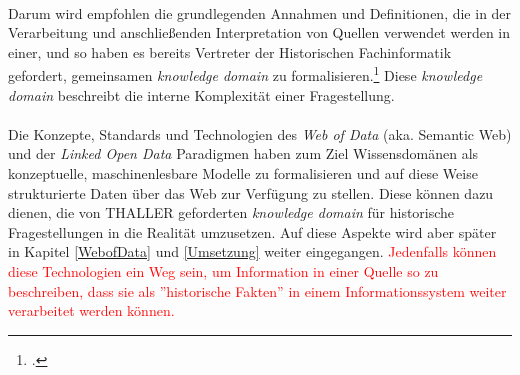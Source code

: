 \documentclass[12pt,a4paper]{article}
\begin{document}
\\
Darum wird empfohlen die grundlegenden Annahmen und Definitionen, die in der Verarbeitung und anschließenden Interpretation von Quellen verwendet werden in einer, und so haben es bereits Vertreter der Historischen Fachinformatik gefordert, gemeinsamen \textit{knowledge domain} zu formalisieren.\footcite[][S.263]{thaller2017historical} Diese \textit{knowledge domain} beschreibt die interne Komplexität einer Fragestellung.
\\
\\
Die Konzepte, Standards und Technologien des \textit{Web of Data} (aka. Semantic Web) und der \textit{Linked Open Data} Paradigmen haben zum Ziel Wissensdomänen als konzeptuelle, maschinenlesbare Modelle zu formalisieren und auf diese Weise strukturierte Daten über das Web zur Verfügung zu stellen. Diese können dazu dienen, die von THALLER geforderten \textit{knowledge domain} für historische Fragestellungen in die Realität umzusetzen. Auf diese Aspekte wird aber später in Kapitel \ref{WebofData} und \ref{Umsetzung} weiter eingegangen.
\textcolor{red}
{Jedenfalls können diese Technologien ein Weg sein, um Information in einer Quelle so zu beschreiben, dass sie als ''historische Fakten'' in einem Informationssystem weiter verarbeitet werden können.
}

\end{document}
